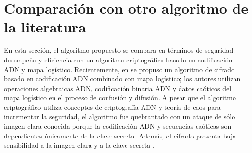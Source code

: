 \begin{table}[!htbp] %
	\center 
	\caption{Tiempo de cifrado en segundos para imágenes a color RGB.}
\end{table}

\begin{table}[!htbp] %
	\center
	\caption{Tiempo de cifrado en segundos para imágenes a escala de grises, donde NP significa que no presento.}
\end{table}

\section{Comparación con otro algoritmo de la literatura}
En esta sección, el algoritmo propuesto se compara en términos de seguridad, desempeño y eficiencia con un algoritmo criptográfico basado en codificación ADN y mapa logístico. Recientemente, en \cite{LEtAl_2012a} se propuso un algoritmo de cifrado basado en codificación ADN combinado con mapa logístico; los autores utilizan operaciones algebraicas ADN, codificación binaria ADN y datos caóticos del mapa logístico en el proceso de confusión y difusión. A pesar que el algoritmo criptográfico utiliza conceptos de criptografía ADN y teoría de caos para incrementar la seguridad, el algoritmo  fue quebrantado con un ataque de sólo imagen clara conocida porque la codificación ADN y secuencias caóticas son dependientes únicamente de la clave secreta. Además, el cifrado presenta baja sensibilidad a la imagen clara y a la clave secreta \cite{L_2014}. \\

